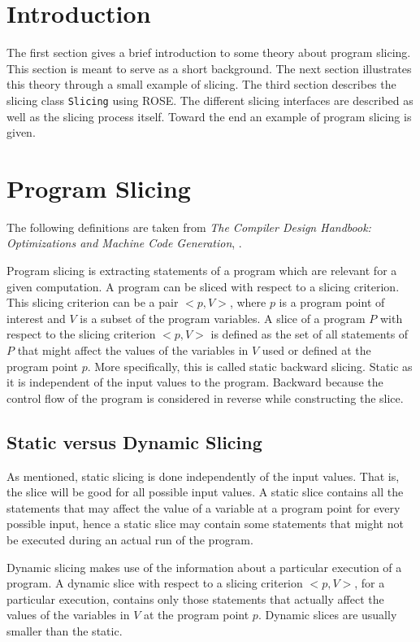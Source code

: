 \documentclass[11pt,a4paper,twoside]{article}
\begin{document}
\tableofcontents
\newpage
\section{Introduction}
The first section gives a brief introduction to some theory about program slicing. This section is meant to serve as a short background. The next section illustrates this theory through a small example of slicing. The third section describes the slicing class \texttt{Slicing} using ROSE. The different slicing interfaces are described as well as the slicing process itself. Toward the end an example of program slicing is given. 

\section{Program Slicing}
The following definitions are taken from \textit{The Compiler Design Handbook: Optimizations and Machine Code Generation}, \cite{chp8}.

Program slicing is extracting statements of a program which are relevant for a given computation. A program can be sliced with respect to a slicing criterion. This slicing criterion can be a pair $<p, V>$, where $p$ is a program point of interest and $V$ is a subset of the program variables. A slice of a program $P$ with respect to the slicing criterion $<p,V>$ is defined as the set of all statements of $P$ that might affect the values of the variables in $V$ used or defined at the program point $p$. More specifically, this is called static backward slicing. Static as it is independent of the input values to the program. Backward because the control flow of the program is considered in reverse while constructing the slice.

\subsection{Static versus Dynamic Slicing}
As mentioned, static slicing is done independently of the input values. That is, the slice will be good for all possible input values. A static slice contains all the statements that may affect the value of a variable at a program point for every possible input, hence a static slice may contain some statements that might not be executed during an actual run of the program.

Dynamic slicing makes use of the information about a particular execution of a program. A dynamic slice with respect to a slicing criterion $<p,V>$, for a particular execution, contains only those statements that actually affect the values of the variables in $V$ at the program point $p$. Dynamic slices are usually smaller than the static.
\end{document}
